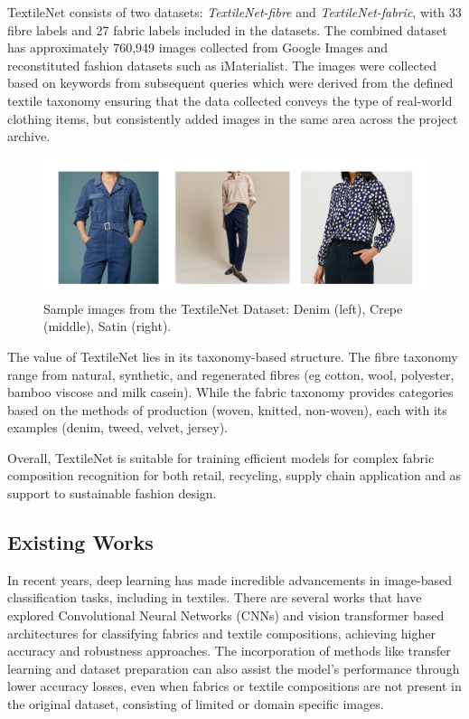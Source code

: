 TextileNet consists of two datasets: \textit{TextileNet-fibre} and \textit{TextileNet-fabric}, with 33 fibre labels and 27 fabric labels included in the datasets. The combined dataset has approximately 760,949 images collected from Google Images and reconstituted fashion datasets such as iMaterialist. The images were collected based on keywords from subsequent queries which were derived from the defined textile taxonomy ensuring that the data collected conveys the type of real-world clothing items, but consistently added images in the same area across the project archive.

\begin{figure}[H]
    \centering
    \begin{minipage}{0.8\linewidth}
        \includegraphics[width=\linewidth]{images/TextileNetDataset.png}
    \end{minipage}
    \caption[Sample images from the TextileNet Dataset]{Sample images from the TextileNet Dataset: Denim (left), Crepe (middle), Satin (right).}
\end{figure}

The value of TextileNet lies in its taxonomy-based structure. The fibre taxonomy range from natural, synthetic, and regenerated fibres (eg cotton, wool, polyester, bamboo viscose and milk casein). While the fabric taxonomy provides categories based on the methods of production (woven, knitted, non-woven), each with its examples (denim, tweed, velvet, jersey).

Overall, TextileNet is suitable for training efficient models for complex fabric composition recognition for both retail, recycling, supply chain application and as support to sustainable fashion design.

\subsection{Existing Works}

In recent years, deep learning has made incredible advancements in image-based classification tasks, including in textiles. There are several works that have explored Convolutional Neural Networks (CNNs) and vision transformer based architectures for classifying fabrics and textile compositions, achieving higher accuracy and robustness approaches. The incorporation of methods like transfer learning and dataset preparation can also assist the model's performance through lower accuracy losses, even when fabrics or textile compositions are not present in the original dataset, consisting of limited or domain specific images. 

